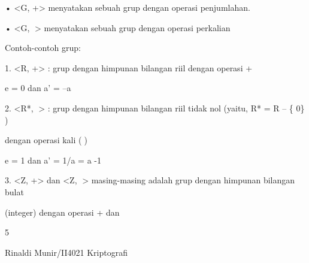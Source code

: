 \documentclass{article}
\begin{document}

• <G, +>  menyatakan sebuah grup dengan operasi penjumlahan.

• <G, > menyatakan sebuah grup dengan operasi perkalian

Contoh-contoh grup:

1. <R, +> : grup dengan himpunan bilangan riil dengan operasi +


e = 0 dan a’ = –a  

2. <R*, > :  grup dengan himpunan bilangan riil tidak nol (yaitu, R* = R – \{ 0\} ) 

dengan operasi kali ()


e = 1 dan a’ = 1/a = a -1

3.   <Z, +> dan <Z, > masing-masing adalah grup dengan himpunan bilangan bulat 

(integer) dengan operasi + dan 

5

Rinaldi Munir/II4021 Kriptografi
\end{document}
